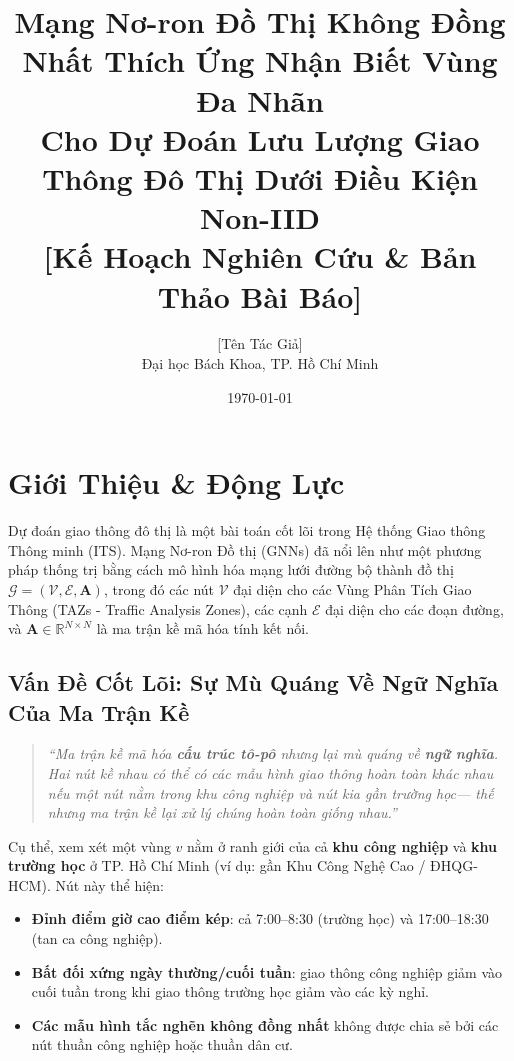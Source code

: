 \documentclass[12pt,a4paper]{article}
\title{\textbf{Mạng Nơ-ron Đồ Thị Không Đồng Nhất Thích Ứng Nhận Biết Vùng Đa Nhãn\\
Cho Dự Đoán Lưu Lượng Giao Thông Đô Thị Dưới Điều Kiện Non-IID}\\[0.5em]
\large{[Kế Hoạch Nghiên Cứu \& Bản Thảo Bài Báo]}}
\author{[Tên Tác Giả] \\ Đại học Bách Khoa, TP. Hồ Chí Minh}
\date{\today}
\begin{document}
\maketitle
\tableofcontents
\newpage

\section{Giới Thiệu \& Động Lực}

Dự đoán giao thông đô thị là một bài toán cốt lõi trong Hệ thống Giao thông Thông minh (ITS).
Mạng Nơ-ron Đồ thị (GNNs) đã nổi lên như một phương pháp thống trị bằng cách mô hình hóa mạng lưới
đường bộ thành đồ thị $\mathcal{G} = (\mathcal{V}, \mathcal{E}, \mathbf{A})$, trong đó các nút
$\mathcal{V}$ đại diện cho các Vùng Phân Tích Giao Thông (TAZs - Traffic Analysis Zones), các cạnh $\mathcal{E}$ đại diện cho các đoạn đường, và
$\mathbf{A} \in \mathbb{R}^{N \times N}$ là ma trận kề mã hóa tính kết nối.

\subsection{Vấn Đề Cốt Lõi: Sự Mù Quáng Về Ngữ Nghĩa Của Ma Trận Kề}

\begin{quote}
\textit{``Ma trận kề mã hóa \textbf{cấu trúc tô-pô} nhưng lại mù quáng về
\textbf{ngữ nghĩa}. Hai nút kề nhau có thể có các mẫu hình giao thông hoàn toàn khác nhau
nếu một nút nằm trong khu công nghiệp và nút kia gần trường học---
thế nhưng ma trận kề lại xử lý chúng hoàn toàn giống nhau.''}
\end{quote}

Cụ thể, xem xét một vùng $v$ nằm ở ranh giới của cả \textbf{khu công nghiệp} và \textbf{khu trường học} ở TP. Hồ Chí Minh (ví dụ: gần
Khu Công Nghệ Cao / ĐHQG-HCM). Nút này thể hiện:

\begin{itemize}
    \item \textbf{Đỉnh điểm giờ cao điểm kép}: cả 7:00--8:30 (trường học) và
          17:00--18:30 (tan ca công nghiệp).
    \item \textbf{Bất đối xứng ngày thường/cuối tuần}: giao thông công nghiệp giảm vào
          cuối tuần trong khi giao thông trường học giảm vào các kỳ nghỉ.
    \item \textbf{Các mẫu hình tắc nghẽn không đồng nhất} không được chia sẻ bởi các nút
          thuần công nghiệp hoặc thuần dân cư.
\end{itemize}
\end{document}
